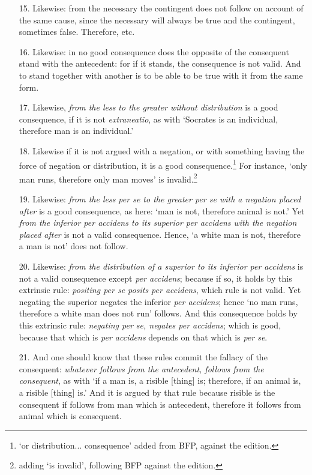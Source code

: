 \documentclass[]{article}
\begin{document}
\begin{itemize}
\item[15.] Likewise: from the necessary the contingent does not follow on account of the same cause, since the necessary will always be true and the contingent, sometimes false. Therefore, etc. 
\item[16.] Likewise: in no good consequence does the opposite of the consequent stand with the antecedent: for if it stands, the consequence is not valid. And to stand together with another is to be able to be true with it from the same form.
\item[17.] Likewise, \textit{from the less to the greater without distribution} is a good consequence, if it is not \textit{extraneatio}, as with `Socrates is an individual, therefore man is an individual.'
\item[18.] Likewise if it is not argued with a negation, or with something having the force of negation or distribution, it is a good consequence.\footnote{`or distribution... consequence' added from BFP, against the edition.} For instance,  `only man runs, therefore only man moves' is invalid.\footnote{adding `is invalid', following BFP against the edition.}
\item[19.]Likewise: \textit{from the less per se to the greater per se with a negation placed after} is a good consequence, as here: `man is not, therefore animal is not.' Yet \textit{from the inferior per accidens to its superior per accidens with the negation placed after} is not a valid consequence. Hence, `a white man is not, therefore a man is not' does not follow.
\item[20.] Likewise: \textit{from the distribution of a superior to its inferior per accidens} is not a valid consequence except \textit{per accidens}; because if so, it holds by this extrinsic rule: \textit{positing per se posits per accidens}, which rule is not valid. Yet negating the superior negates the inferior \textit{per accidens}; hence `no man runs, therefore a white man does not run' follows. And this consequence holds by this extrinsic rule: \textit{negating per se, negates per accidens}; which is good, because that which is \textit{per accidens} depends on that which is \textit{per se}.
\item[21.] And one should know that these rules commit the fallacy of the consequent: \textit{whatever follows from the antecedent, follows from the consequent}, as with `if a man is, a risible [thing] is; therefore, if an animal is, a risible [thing] is.' And it is argued by that rule because risible is the consequent if follows from man which is antecedent, therefore it follows from animal which is consequent.

\end{itemize}
\end{document}
